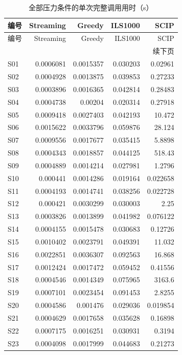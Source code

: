 {\small\setlength{\tabcolsep}{4pt}
\begin{longtable}{lrrrr}
\caption{全部压力条件的单次完整调用用时（s）}\label{tab:stress_times}\\
\toprule
编号 & Streaming & Greedy & ILS1000 & SCIP\\
\midrule
\endfirsthead
\toprule
编号 & Streaming & Greedy & ILS1000 & SCIP\\
\midrule
\endhead
\midrule
\multicolumn{5}{r}{续下页}\\
\endfoot
\bottomrule
\endlastfoot
S01 & 0.0006081 & 0.0015357 & 0.030203 & 0.02961\\
S02 & 0.0004928 & 0.0013875 & 0.039853 & 0.27233\\
S03 & 0.0003896 & 0.0016365 & 0.042814 & 0.28483\\
S04 & 0.0004738 & 0.00204 & 0.020314 & 0.27918\\
S05 & 0.0009418 & 0.0027403 & 0.042193 & 10.472\\
S06 & 0.0015622 & 0.0033796 & 0.059876 & 28.124\\
S07 & 0.0009556 & 0.0017677 & 0.035415 & 5.8898\\
S08 & 0.0004343 & 0.0018857 & 0.044125 & 518.43\\
S09 & 0.0004889 & 0.0014214 & 0.027981 & 1.2796\\
S10 & 0.000441 & 0.0014286 & 0.019164 & 0.022658\\
S11 & 0.0004193 & 0.0014741 & 0.038256 & 0.022728\\
S12 & 0.000421 & 0.0030299 & 0.030003 & 2.25\\
S13 & 0.0003826 & 0.0013899 & 0.041982 & 0.076122\\
S14 & 0.0004155 & 0.0015478 & 0.030683 & 0.12726\\
S15 & 0.0010402 & 0.0023791 & 0.049391 & 11.032\\
S16 & 0.0022851 & 0.0036307 & 0.092563 & 16.868\\
S17 & 0.0012424 & 0.0017472 & 0.059452 & 0.41556\\
S18 & 0.0004546 & 0.0014349 & 0.075965 & 3163.6\\
S19 & 0.0007101 & 0.0023454 & 0.091453 & 2.8255\\
S20 & 0.0004586 & 0.001476 & 0.029036 & 0.019854\\
S21 & 0.0004629 & 0.0017658 & 0.035628 & 0.16898\\
S22 & 0.0007175 & 0.0016251 & 0.030931 & 0.3194\\
S23 & 0.0004098 & 0.0017999 & 0.044683 & 0.21273\\

\end{longtable}}
